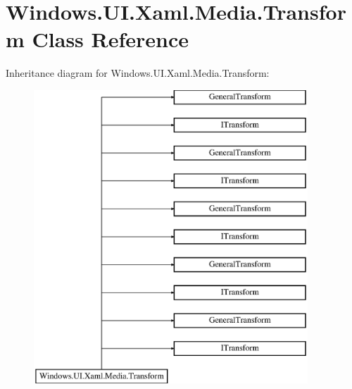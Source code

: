 \hypertarget{class_windows_1_1_u_i_1_1_xaml_1_1_media_1_1_transform}{}\section{Windows.\+U\+I.\+Xaml.\+Media.\+Transform Class Reference}
\label{class_windows_1_1_u_i_1_1_xaml_1_1_media_1_1_transform}
Inheritance diagram for Windows.\+U\+I.\+Xaml.\+Media.\+Transform\+:\begin{figure}[H]
\begin{center}
\leavevmode
\includegraphics[height=11.000000cm]{class_windows_1_1_u_i_1_1_xaml_1_1_media_1_1_transform}
\end{center}
\end{figure}
